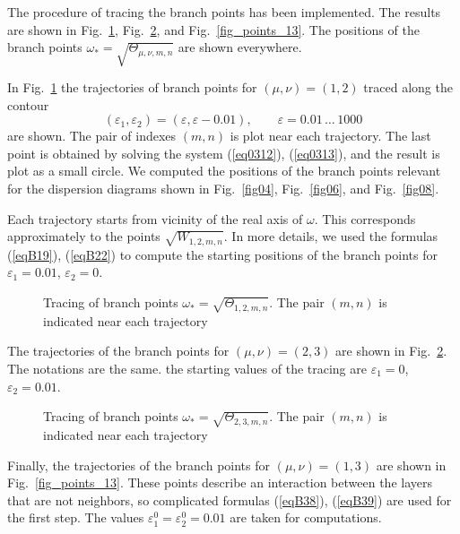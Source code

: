 \documentclass[12pt]{article}
\newcommand{\eps}{\varepsilon}
\begin{document}
The procedure  of tracing the branch points has been implemented. 
The results are shown in Fig.~\ref{fig_points_12}, Fig.~\ref{fig_points_23}, and 
Fig.~\ref{fig_points_13}.  The positions of the 
branch points $\omega_* = \sqrt{\Theta_{\mu,\nu,m,n}}$ are shown everywhere.

In Fig.~\ref{fig_points_12}
the trajectories of branch points 
for $(\mu,\nu) = (1,2)$
traced along the contour 
\[
(\eps_1, \eps_2) = (\eps , \eps - 0.01),
\qquad  
\eps = 0.01 \, \dots \, 1000
\]
are shown.
The pair of indexes $(m,n)$ is plot near each trajectory. 
The last point is obtained by solving the system (\ref{eq0312}), (\ref{eq0313}),
and the result is plot as a small circle. 
We computed the positions of the branch points relevant for the  dispersion diagrams 
shown in Fig.~\ref{fig04}, Fig.~\ref{fig06}, and Fig.~\ref{fig08}. 

Each trajectory starts from vicinity of the real axis of $\omega$. This corresponds 
approximately to the 
points $\sqrt{W_{1,2,m,n}}$. In more details, we used 
the formulas (\ref{eqB19}), (\ref{eqB22}) to compute the starting positions of the 
branch points for $\eps_1 = 0.01$, $\eps_2 = 0$.     

\begin{figure}[ht]
\centerline{}
\caption{Tracing of branch points $\omega_* = \sqrt{\Theta_{1,2,m,n}}$. The pair $(m,n)$ is 
indicated near each trajectory} 
\label{fig_points_12}
\end{figure}

The trajectories of the branch points for $(\mu,\nu) = (2,3)$ are shown 
in Fig.~\ref{fig_points_23}. The notations are the same. the starting values of the tracing are
$\eps_1 =0$, $\eps_2 = 0.01$.

\begin{figure}[ht]
\centerline{}
\caption{Tracing of branch points $\omega_* = \sqrt{\Theta_{2,3,m,n}}$. The pair $(m,n)$ is 
indicated near each trajectory} 
\label{fig_points_23}
\end{figure}

Finally, the  trajectories of the branch points for $(\mu,\nu) = (1,3)$ are shown 
in Fig.~\ref{fig_points_13}. These points describe an interaction between the layers 
that are not neighbors, so complicated formulas (\ref{eqB38}), (\ref{eqB39}) are used for the first step. The values $\eps_1^0 = \eps_2^0 = 0.01$ are taken for computations.  
\end{document}
